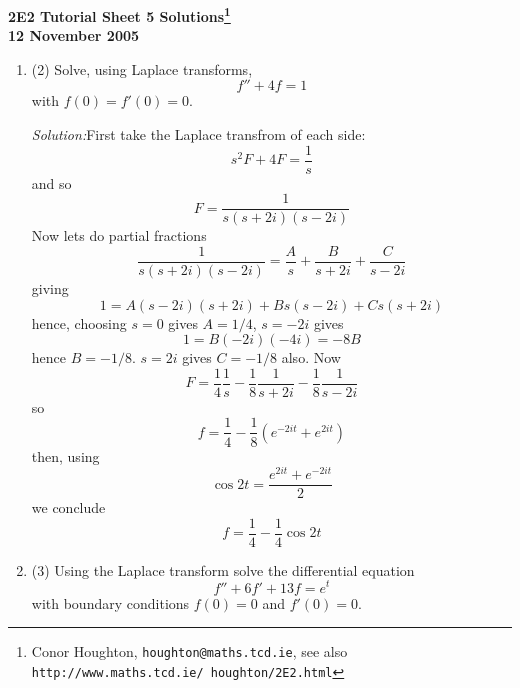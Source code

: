 \documentclass[12pt]{article}
\newcommand{\soln}{\noindent\textit{Solution:}}
\begin{document}
\begin{center}

{\bf 2E2 Tutorial Sheet 5 Solutions\footnote{Conor Houghton, {\tt houghton@maths.tcd.ie}, see also {\tt http://www.maths.tcd.ie/ houghton/2E2.html}}\\[1cm] 12 November 2005}
\end{center}


\renewcommand{\labelenumi}{\arabic{enumi}.}



\begin{enumerate}

\item (2) Solve, using Laplace transforms, 
\begin{equation}
f''+4f=1
\end{equation}
with $f(0)=f'(0)=0$.

\soln First take the Laplace transfrom of each side:
\begin{equation}
s^2F+4F=\frac{1}{s}
\end{equation}
and so 
\begin{equation}
F=\frac{1}{s(s+2i)(s-2i)}
\end{equation}
Now lets do partial fractions
\begin{equation}
\frac{1}{s(s+2i)(s-2i)}=\frac{A}{s}+\frac{B}{s+2i}+\frac{C}{s-2i}
\end{equation}
giving
\begin{equation}
1=A(s-2i)(s+2i)+Bs(s-2i)+Cs(s+2i)
\end{equation}
hence, choosing $s=0$ gives $A=1/4$, $s=-2i$ gives
\begin{equation}
1=B(-2i)(-4i)=-8B
\end{equation}
hence $B=-1/8$. $s=2i$ gives $C=-1/8$ also. Now
\begin{equation}
F=\frac{1}{4}\frac{1}{s}-\frac{1}{8}\frac{1}{s+2i}-\frac{1}{8}\frac{1}{s-2i}
\end{equation}
so 
\begin{equation}
f=\frac{1}{4}-\frac{1}{8}\left(e^{-2it}+e^{2it}\right)
\end{equation}
then, using 
\begin{equation}
\cos{2t}=\frac{e^{2it}+e^{-2it}}{2}
\end{equation}
we conclude
\begin{equation}
f=\frac{1}{4}-\frac{1}{4}\cos{2t}
\end{equation}

\item (3)
Using the Laplace transform solve the differential equation
\begin{equation}
f''+6f'+13f=e^t
\end{equation}
with boundary conditions $f(0)=0$ and $f'(0)=0$.


\end{enumerate}
\end{document}
